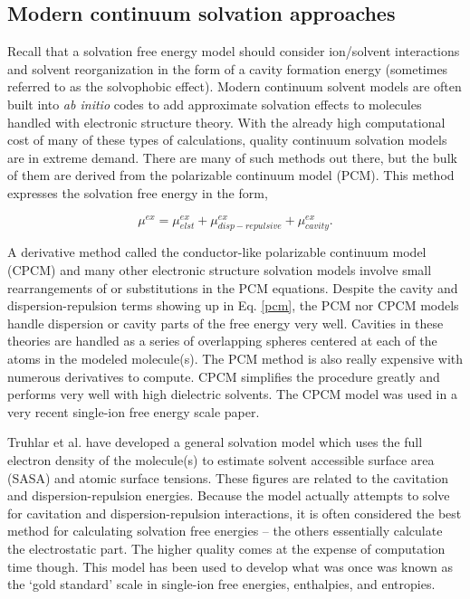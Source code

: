 \begin{intro}
   \subsection{\label{ch1:sec2:level3}Modern continuum solvation approaches}
    Recall that a solvation free energy model should consider ion/solvent interactions and solvent reorganization in the form of a cavity formation energy (sometimes referred 
    to as the solvophobic effect). Modern continuum solvent models are often built into \emph{ab initio} codes to add approximate solvation effects to molecules handled with 
    electronic structure theory. With the already high computational cost of many of these types of calculations, quality continuum solvation models are in extreme demand. 
    There are many of such methods out there, but the bulk of them are derived from the polarizable continuum model (PCM). This method expresses the solvation free energy in 
    the form,
    
    \begin{equation}\label{pcm}
        \mu^{ex} = \mu^{ex}_{elst} + \mu^{ex}_{disp-repulsive} + \mu^{ex}_{cavity}.
    \end{equation}

    A derivative method called the conductor-like polarizable continuum model (CPCM) and many other electronic structure solvation models involve small rearrangements of or 
    substitutions in the PCM equations. Despite the cavity and dispersion-repulsion terms showing up in Eq. \ref{pcm}, the PCM nor CPCM models handle dispersion or cavity 
    parts of the free energy very well\cite{pcmmodels}. Cavities in these theories are handled as a series of overlapping spheres centered at each of the atoms in the modeled 
    molecule(s). The PCM method is also really expensive with numerous derivatives to compute. CPCM simplifies the procedure greatly and performs very well with high dielectric 
    solvents. The CPCM model was used in a very recent single-ion free energy scale paper\cite{ishikawa2016quantum}.

    Truhlar et al. have developed a general solvation model which uses the full electron density of the molecule(s) to estimate solvent accessible surface area (SASA) and
    atomic surface tensions\cite{marenich2009universal}. These figures are related to the cavitation and dispersion-repulsion energies. Because the model actually attempts to 
    solve for cavitation and dispersion-repulsion interactions, it is often considered the best method for calculating solvation free energies -- the others essentially calculate
    the electrostatic part. The higher quality comes at the expense of computation time though. This model has been used to develop what was once was known as the `gold standard'
    scale in single-ion free energies, enthalpies, and entropies\cite{coe1998cpa1,kelly2006cpa}.


\end{intro}
